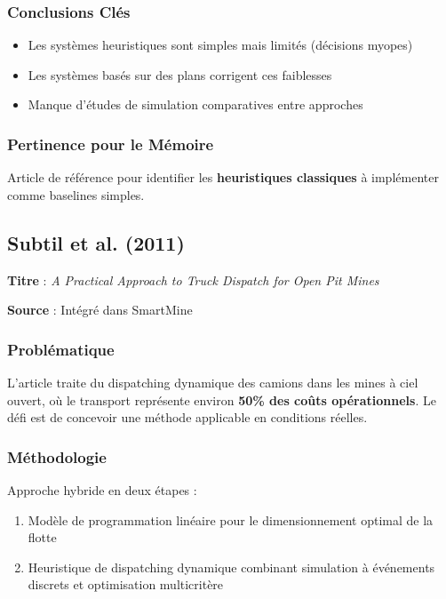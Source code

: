 \documentclass[12pt,a4paper]{article}
\begin{document}
\subsubsection{Conclusions Cl\'es}

\begin{itemize}
    \item Les syst\`emes heuristiques sont simples mais limit\'es (d\'ecisions myopes)
    \item Les syst\`emes bas\'es sur des plans corrigent ces faiblesses
    \item Manque d'\'etudes de simulation comparatives entre approches
\end{itemize}

\subsubsection{Pertinence pour le M\'emoire}

Article de r\'ef\'erence pour identifier les \textbf{heuristiques classiques} \`a impl\'ementer comme baselines simples.

\subsection{Subtil et al. (2011)}

\textbf{Titre} : \textit{A Practical Approach to Truck Dispatch for Open Pit Mines}

\textbf{Source} : Int\'egr\'e dans SmartMine\textregistered

\subsubsection{Probl\'ematique}

L'article traite du dispatching dynamique des camions dans les mines \`a ciel ouvert, o\`u le transport repr\'esente environ \textbf{50\% des co\^uts op\'erationnels}. Le d\'efi est de concevoir une m\'ethode applicable en conditions r\'eelles.

\subsubsection{M\'ethodologie}

Approche hybride en deux \'etapes :
\begin{enumerate}
    \item Mod\`ele de programmation lin\'eaire pour le dimensionnement optimal de la flotte
    \item Heuristique de dispatching dynamique combinant simulation \`a \'ev\'enements discrets et optimisation multicrit\`ere
\end{enumerate}
\end{document}
